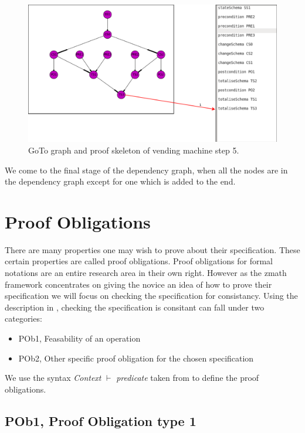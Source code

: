 \begin{figure}[H]
\includegraphics[scale=0.3]{Figures/skeleton/5.png}
\caption{GoTo graph and proof skeleton of vending machine step 5.}
\label{fig:5}
\end{figure}

We come to the final stage of the dependency graph, when all the nodes are in the dependency graph except for one which is added to the end.

\section{Proof Obligations}
\label{sec:proofobl}

There are many properties one may wish to prove about their specification. These certain properties are called proof obligations. Proof obligations for formal notations are an entire research area in their own right. However as the \gls{zmath} framework concentrates on giving the novice an idea of how to prove their specification we will focus on checking the specification for consistancy. Using the description in \cite{DBLP:conf/icsea/WenMZ06}, checking the specification is consitant can fall under two categories:

\begin{itemize}
\item POb1, Feasability of an operation
\item POb2, Other specific proof obligation for the chosen specification
\end{itemize}

We use the syntax \textit{Context} $\vdash$ \textit{predicate} taken from \cite{DBLP:conf/icsea/WenMZ06} to define the proof obligations.

\subsection{POb1, Proof Obligation type 1}
\label{subsec:pob1}

